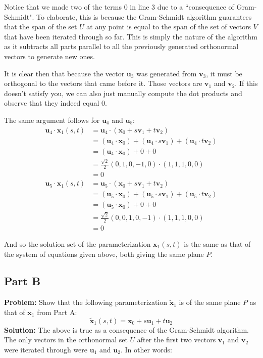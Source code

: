 \documentclass{article}
\begin{document}
Notice that we made two of the terms 0 in line 3 due to a ``consequence of Gram-Schmidt". To elaborate, this is because the Gram-Schmidt algorithm guarantees that the span of the set $U$ at any point is equal to the span of the set of vectors $V$ that have been iterated through so far. This is simply the nature of the algorithm as it subtracts all parts parallel to all the previously generated orthonormal vectors to generate new ones.

It is clear then that because the vector $\mathbf u_3$ was generated from $\mathbf v_3$, it must be orthogonal to the vectors that came before it. Those vectors are $\mathbf v_1$ and $\mathbf v_2$. If this doesn't satisfy you, we can also just manually compute the dot products and observe that they indeed equal 0.

The same argument follows for $\mathbf u_4$ and $\mathbf u_5$:
\begin{align*}
  \mathbf u_4\cdot\mathbf x_1(s,t)&=\mathbf u_4\cdot(\mathbf x_0+s\mathbf v_1+t\mathbf v_2)\\
  &=(\mathbf u_4\cdot\mathbf x_0)+(\mathbf u_4\cdot s\mathbf v_1)+(\mathbf u_4\cdot t\mathbf v_2)\tag{distr. of dot prod.}\\
  &=(\mathbf u_4\cdot\mathbf x_0)+0+0\tag{consequence of Gram-Schmidt}\\
  &=\frac{\sqrt 2}{2}(0,1,0,-1,0)\cdot(1,1,1,0,0)\\
  &=0
\end{align*}
\begin{align*}
  \mathbf u_5\cdot\mathbf x_1(s,t)&=\mathbf u_5\cdot(\mathbf x_0+s\mathbf v_1+t\mathbf v_2)\\
  &=(\mathbf u_5\cdot\mathbf x_0)+(\mathbf u_5\cdot s\mathbf v_1)+(\mathbf u_5\cdot t\mathbf v_2)\tag{distr. of dot prod.}\\
  &=(\mathbf u_5\cdot\mathbf x_0)+0+0\tag{consequence of Gram-Schmidt}\\
  &=\frac{\sqrt 2}{2}(0,0,1,0,-1)\cdot(1,1,1,0,0)\\
  &=0
\end{align*}

And so the solution set of the parameterization $\mathbf x_1(s,t)$  is the same as that of the system of equations given above, both giving the same plane $P$.

\subsection*{Part B}
\textbf{Problem:} Show that the following parameterization $\tilde{\mathbf x}_1$ is of the same plane $P$ as that of $\mathbf x_1$ from Part A:
$$\tilde{\mathbf x}_1(s,t)=\mathbf x_0+s\mathbf u_1+t\mathbf u_2$$
\textbf{Solution:} The above is true as a consequence of the Gram-Schmidt algorithm. The only vectors in the orthonormal set $U$ after the first two vectors $\mathbf v_1$ and $\mathbf v_2$ were iterated through were $\mathbf u_1$ and $\mathbf u_2$. In other words:
\end{document}
